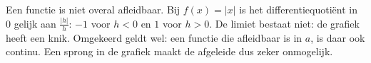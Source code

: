 Een functie is niet overal afleidbaar. Bij $f(x) = |x|$ is het differentiequotiënt in $0$ gelijk aan $\frac{|h|}{h}$: $-1$ voor $h < 0$ en $1$ voor $h > 0$. De limiet bestaat niet: de grafiek heeft een knik. Omgekeerd geldt wel: een functie die afleidbaar is in $a$, is daar ook continu. Een sprong in de grafiek maakt de afgeleide dus zeker onmogelijk.

\begin{oefeningen}
\end{oefeningen}

\opdrachtenkop

\begin{oefeningen}


























\end{oefeningen}


